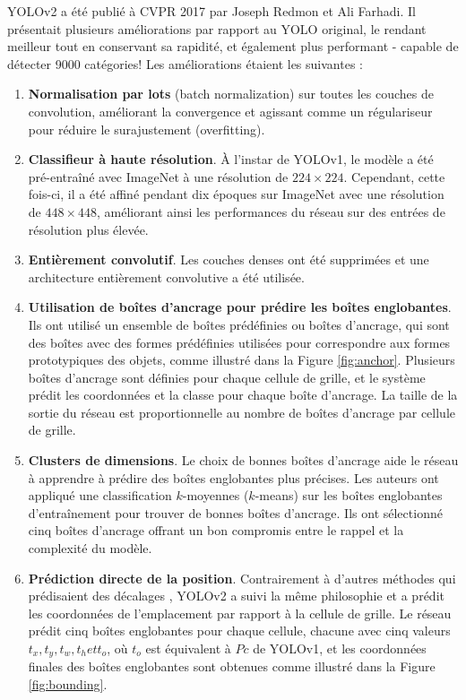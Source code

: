 \documentclass{article}
\begin{document}
YOLOv2 a été publié à CVPR 2017 \cite{44} par Joseph Redmon et Ali Farhadi. Il présentait plusieurs améliorations par rapport au YOLO original, le rendant meilleur tout en conservant sa rapidité, et également plus performant - capable de détecter 9000 catégories! Les améliorations étaient les suivantes :\\
\begin{enumerate}
    \item \textbf{Normalisation par lots} (batch normalization) sur toutes les couches de convolution, améliorant la convergence et agissant comme un régulariseur pour réduire le surajustement (overfitting).
    \item \textbf{Classifieur à haute résolution}. À l'instar de YOLOv1, le modèle a été pré-entraîné avec ImageNet à une résolution de $224 \times 224$. Cependant, cette fois-ci, il a été affiné pendant dix époques sur ImageNet avec une résolution de $448 \times 448$, améliorant ainsi les performances du réseau sur des entrées de résolution plus élevée.
    \item \textbf{Entièrement convolutif}. Les couches denses ont été supprimées et une architecture entièrement convolutive a été utilisée.
    \item \textbf{Utilisation de boîtes d'ancrage pour prédire les boîtes englobantes}. Ils ont utilisé un ensemble de boîtes prédéfinies ou boîtes d'ancrage, qui sont des boîtes avec des formes prédéfinies utilisées pour correspondre aux formes prototypiques des objets, comme illustré dans la Figure \ref{fig:anchor}. Plusieurs boîtes d'ancrage sont définies pour chaque cellule de grille, et le système prédit les coordonnées et la classe pour chaque boîte d'ancrage. La taille de la sortie du réseau est proportionnelle au nombre de boîtes d'ancrage par cellule de grille.
    \item \textbf{Clusters de dimensions}. Le choix de bonnes boîtes d'ancrage aide le réseau à apprendre à prédire des boîtes englobantes plus précises. Les auteurs ont appliqué une classification $k$-moyennes ($k$-means) sur les boîtes englobantes d'entraînement pour trouver de bonnes boîtes d'ancrage. Ils ont sélectionné cinq boîtes d'ancrage offrant un bon compromis entre le rappel et la complexité du modèle.
    \item \textbf{Prédiction directe de la position}. Contrairement à d'autres méthodes qui prédisaient des décalages \cite{45}, YOLOv2 a suivi la même philosophie et a prédit les coordonnées de l'emplacement par rapport à la cellule de grille. Le réseau prédit cinq boîtes englobantes pour chaque cellule, chacune avec cinq valeurs $t_x, t_y, t_w, t_h et t_o$, où $t_o$ est équivalent à $Pc$ de YOLOv1, et les coordonnées finales des boîtes englobantes sont obtenues comme illustré dans la Figure \ref{fig:bounding}.

\end{enumerate}
\end{document}
